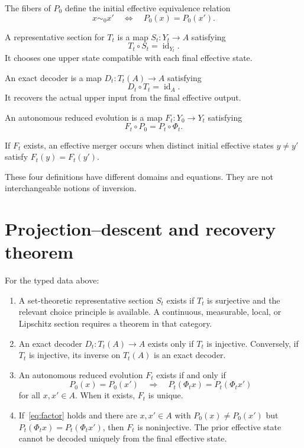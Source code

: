 \documentclass[11pt]{article}
\begin{document}
The fibers of $P_0$ define the initial effective equivalence relation
\[
 x\sim_0x'\quad\Longleftrightarrow\quad P_0(x)=P_0(x').
\]

\begin{definition}
A representative section for $T_t$ is a map $S_t:Y_t\to A$ satisfying
\[
 T_t\circ S_t=\operatorname{id}_{Y_t}.
\]
It chooses one upper state compatible with each final effective state.
\end{definition}

\begin{definition}
An exact decoder is a map $D_t:T_t(A)\to A$ satisfying
\[
 D_t\circ T_t=\operatorname{id}_A.
\]
It recovers the actual upper input from the final effective output.
\end{definition}

\begin{definition}
An autonomous reduced evolution is a map $F_t:Y_0\to Y_t$ satisfying
\[
 F_t\circ P_0=P_t\circ\Phi_t.
\]
\end{definition}

\begin{definition}
If $F_t$ exists, an effective merger occurs when distinct initial effective
states $y\ne y'$ satisfy $F_t(y)=F_t(y')$.
\end{definition}

These four definitions have different domains and equations. They are not
interchangeable notions of inversion.

\section{Projection--descent and recovery theorem}

\begin{theorem}\label{thm:main}
For the typed data above:
\begin{enumerate}
\item A set-theoretic representative section $S_t$ exists if $T_t$ is
surjective and the relevant choice principle is available. A continuous,
measurable, local, or Lipschitz section requires a theorem in that category.
\item An exact decoder $D_t:T_t(A)\to A$ exists only if $T_t$ is injective.
Conversely, if $T_t$ is injective, its inverse on $T_t(A)$ is an exact decoder.
\item An autonomous reduced evolution $F_t$ exists if and only if
\begin{equation}
 P_0(x)=P_0(x')
 \quad\Longrightarrow\quad
 P_t(\Phi_t x)=P_t(\Phi_t x')
 \label{eq:factor}
\end{equation}
for all $x,x'\in A$. When it exists, $F_t$ is unique.
\item If~\eqref{eq:factor} holds and there are $x,x'\in A$ with
$P_0(x)\ne P_0(x')$ but
$P_t(\Phi_t x)=P_t(\Phi_t x')$, then $F_t$ is noninjective. The prior
effective state cannot be decoded uniquely from the final effective state.
\end{enumerate}
\end{theorem}
\end{document}
